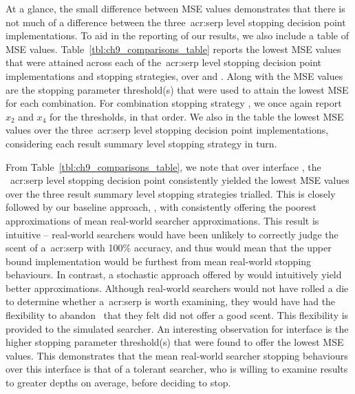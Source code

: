 At a glance, the small difference between MSE values demonstrates that there is not much of a difference between the three~\gls{acr:serp} level stopping decision point implementations. To aid in the reporting of our results, we also include a table of MSE values. Table~\ref{tbl:ch9_comparisons_table} reports the lowest MSE values that were attained across each of the~\gls{acr:serp} level stopping decision point implementations and stopping strategies, over  and . Along with the MSE values are the stopping parameter threshold(s) that were used to attain the lowest MSE for each combination. For combination stopping strategy , we once again report $x_2$ and $x_4$ for the thresholds, in that order. We also  in the table the lowest MSE values over the three~\gls{acr:serp} level stopping decision point implementations, considering each result summary level stopping strategy in turn.

From Table~\ref{tbl:ch9_comparisons_table}, we note that over interface , the ~\gls{acr:serp} level stopping decision point consistently yielded the lowest MSE values over the three result summary level stopping strategies trialled. This is closely followed by our baseline approach, , with  consistently offering the poorest approximations of mean real-world searcher approximations. This result is intuitive -- real-world searchers would have been unlikely to correctly judge the scent of a~\gls{acr:serp} with 100\% accuracy, and thus would mean that the upper bound  implementation would be furthest from mean real-world stopping behaviours. In contrast, a stochastic approach offered by  would intuitively yield better approximations. Although real-world searchers would not have rolled a die to determine whether a~\gls{acr:serp} is worth examining, they would have had the flexibility to abandon~ that they felt did not offer a good scent. This flexibility is provided to the  simulated searcher. An interesting observation for interface  is the higher stopping parameter threshold(s) that were found to offer the lowest MSE values. This demonstrates that the mean real-world searcher stopping behaviours over this interface is that of a tolerant searcher, who is willing to examine results to greater depths on average, before deciding to stop.

